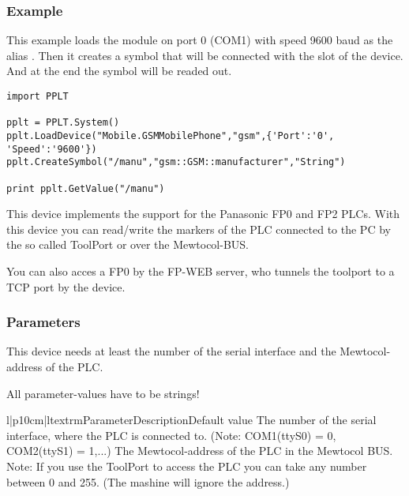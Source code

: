 \subsubsection{Example}
This example loads the  module on port 0 (COM1) with speed 9600 baud as the alias . Then it creates a symbol 
that will be connected with the  slot of the device. And at the end the symbol will be readed out.
\begin{verbatim}
import PPLT

pplt = PPLT.System()
pplt.LoadDevice("Mobile.GSMMobilePhone","gsm",{'Port':'0', 'Speed':'9600'})
pplt.CreateSymbol("/manu","gsm::GSM::manufacturer","String")

print pplt.GetValue("/manu")
\end{verbatim}






This device implements the support for the Panasonic FP0 and FP2 PLCs. With 
this device you can read/write the markers of the PLC connected to the PC by 
the so called ToolPort or over the Mewtocol-BUS. 

You can also acces a FP0 by the FP-WEB server, who tunnels the toolport to a 
TCP port by the  device. 

\subsubsection{Parameters}
This device needs at least the number of the serial interface and
the Mewtocol-address of the PLC.
\begin{notice}
All parameter-values have to be strings!
\end{notice}

\begin{tableiii}{l|p{10cm}|l}{textrm}{Parameter}{Description}{Default value}
        {The number of the serial interface, where the PLC is connected to. (Note: COM1(ttyS0) = 0, COM2(ttyS1) = 1,...)}
        {}
        {The Mewtocol-address of the PLC in the Mewtocol BUS. Note: If you use
        the ToolPort to access the PLC you can take any number between 0 and
        255. (The mashine will ignore the address.)}
        {}
\end{tableiii}

